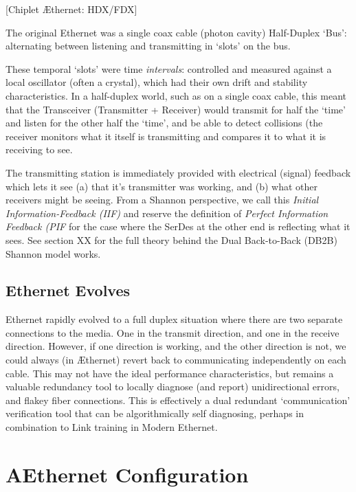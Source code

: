\documentclass[../../../OAE-SPEC-MAIN.tex]{subfiles}
\begin{document}
  
[Chiplet Æthernet: HDX/FDX]
   
The original Ethernet was a single coax cable (photon cavity) Half-Duplex `Bus':  alternating between listening and transmitting in `slots' on the bus.
\bigskip
 
These temporal `slots' were time \emph{intervals}: controlled and measured against a local oscillator (often a crystal), which had their own drift and stability characteristics. In a half-duplex world, such as on a single coax cable, this meant that the Transceiver (Transmitter + Receiver) would transmit for half the `time' and listen for the other half the `time', and be able to detect collisions (the receiver monitors what it itself is transmitting and compares it to what it is receiving to see. 

The transmitting station is immediately provided with electrical (signal) feedback which lets it see (a) that it's transmitter  was working, and (b) what other receivers might be seeing. From a Shannon perspective, we call this \emph{Initial Information-Feedback (IIF)} and reserve the definition of \emph{Perfect Information Feedback (PIF} for the case where the SerDes at the other end is reflecting what it sees.  See section XX for the full theory behind the Dual Back-to-Back (DB2B) Shannon model works.

\subsection{Ethernet Evolves}

Ethernet rapidly evolved to a full duplex situation where there are two separate connections to the media.  One in the transmit direction, and one in the receive direction. However, if one direction is working, and the other direction is not, we could always (in Æthernet) revert back to communicating independently on each cable.  This may not have the ideal performance characteristics, but remains a valuable redundancy tool to locally diagnose (and report) unidirectional errors, and flakey fiber connections. This is effectively a dual redundant `communication' verification tool that can be algorithmically self diagnosing, perhaps in combination to Link training in Modern Ethernet. 

\section{AEthernet Configuration}
\end{document}
